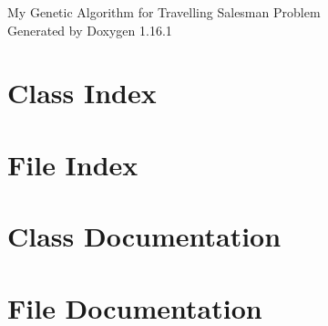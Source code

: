 \documentclass[twoside]{book}
\newcommand{\+}{\discretionary{\mbox{\scriptsize$\hookleftarrow$}}{}{}}
\newcommand{\clearemptydoublepage}{%
    \newpage{\pagestyle{empty}\cleardoublepage}%
  }
\begin{document}
  \raggedbottom
    \hypersetup{pageanchor=false,
                bookmarksnumbered=true,
                pdfencoding=unicode
               }
  \begin{titlepage}
  \vspace*{7cm}
  \begin{center}%
  {\Large My Genetic Algorithm for Travelling Salesman Problem}\\
  \vspace*{1cm}
  {\large Generated by Doxygen 1.16.1}\\
  \end{center}
  \end{titlepage}
  \clearemptydoublepage
  \tableofcontents
  \clearemptydoublepage
  \hypersetup{pageanchor=true}

\chapter{Class Index}

\chapter{File Index}

\chapter{Class Documentation}






\chapter{File Documentation}














  \backmatter
  \newpage
  \clearemptydoublepage
  \printindex
\end{document}

